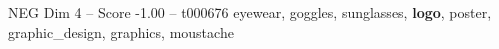 \begin{textsample}{NEG Dim 4 – Score -1.00 – t000676}  \label{ex:f4_neg_013}
eyewear, goggles, sunglasses, \textbf{logo}, poster, graphic\_design, graphics, moustache

\end{textsample}
